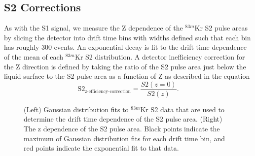 \documentclass[a4paper,12pt]{article}
\begin{document}
{\subsection{S2 Corrections}

As with the S1 signal, we measure the Z dependence of the $^{83m}$Kr S2 pulse areas by slicing the detector into drift time bins with widths defined such that each bin has roughly 300 events. 
An exponential decay is fit to the drift time dependence of the mean of each $^{83m}$Kr S2 distribution.  A detector inefficiency correction for the Z direction is defined by taking the ratio of the S2  pulse area just below the liquid surface to the S2 pulse area as a function of Z as described in the equation
\begin{equation}
\mbox{S}2_{\mbox{z-efficiency-correction}} = \frac{S2(z=0)}{S2(z)}.
\end{equation} 

\begin{figure} 
\centering
{}
\qquad
{}
\caption{ (Left) Gaussian distribution fits to $^{83m}$Kr S2 data that are used to determine the drift time dependence of the S2 pulse area. (Right) The z dependence of the S2 pulse area. Black points indicate the maximum of Gaussian distribution fits for each drift time bin, and red points indicate the exponential fit to that data.}
\label{fig:KrypCal_S2ZDep}
\end{figure}

}
\end{document}
